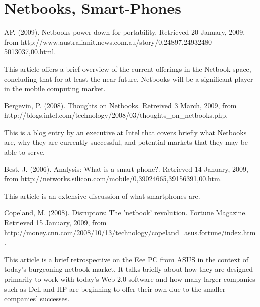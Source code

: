 \documentclass[12pt,oneside,letterpaper,titlepage]{article}
\begin{document}
\section{Netbooks, Smart-Phones}

AP. (2009). Netbooks power down for portability. Retrieved 20 January, 2009, from http://www.australianit.news.com.au/story/0,24897,24932480-5013037,00.html.

This article offers a brief overview of the current offerings in the Netbook
space, concluding that for at least the near future, Netbooks will be a
significant player in the mobile computing market.

Bergevin, P. (2008). Thoughts on Netbooks. Retreived 3 March, 2009, from http://blogs.intel.com/technology/2008/03/thoughts_on_netbooks.php.

This is a blog entry by an executive at Intel that covers briefly what Netbooks
are, why they are currently successful, and potential markets that they may be
able to serve.

Best, J. (2006). Analysis: What is a smart phone?. Retrieved 14 January, 2009, from http://networks.silicon.com/mobile/0,39024665,39156391,00.htm.

This article is an extensive discussion of what smartphones are.

Copeland, M. (2008). Disruptors: The 'netbook' revolution. Fortune Magazine. Retrieved 15 January, 2009, from http://money.cnn.com/2008/10/13/technology/copeland_asus.fortune/index.htm.

This article is a brief retrospective on the Eee PC from ASUS in the context of
today's burgeoning netbook market.  It talks briefly about how they are designed
primarily to work with today's Web 2.0 software and how many larger companies
such as Dell and HP are beginning to offer their own due to the smaller
companies' successes.
\end{document}
